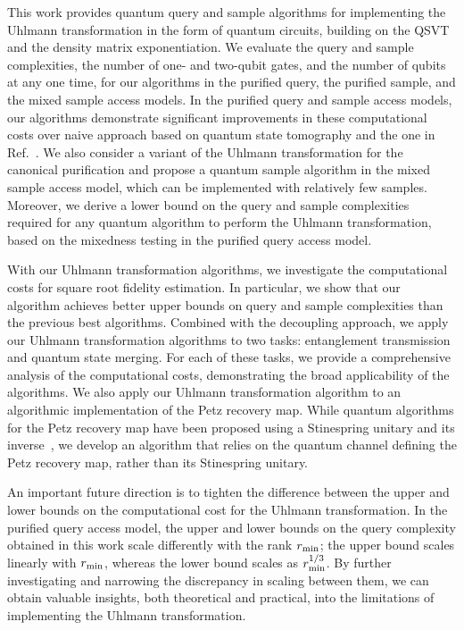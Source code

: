 

This work provides quantum query and sample algorithms for implementing the Uhlmann transformation in the form of quantum circuits, building on the QSVT and the density matrix exponentiation.
We evaluate the query and sample complexities, the number of one- and two-qubit gates, and the number of qubits at any one time, for our algorithms in the purified query, the purified sample, and the mixed sample access models. 
In the purified query and sample access models, our algorithms demonstrate significant improvements in these computational costs over naive approach based on quantum state tomography and the one in Ref.~\cite{metger2023stateqipspace}.
We also consider a variant of the Uhlmann transformation for the canonical purification and propose a quantum sample algorithm in the mixed sample access model, which can be implemented with relatively few samples.
Moreover, we derive a lower bound on the query and sample complexities required for any quantum algorithm to perform the Uhlmann transformation, based on the mixedness testing in the purified query access model.



With our Uhlmann transformation algorithms, we investigate the computational costs for square root fidelity estimation.
In particular, we show that our algorithm achieves better upper bounds on query and sample complexities than the previous best algorithms.
Combined with the decoupling approach, we apply our Uhlmann transformation algorithms to two tasks: entanglement transmission and quantum state merging.
For each of these tasks, we provide a comprehensive analysis of the computational costs, demonstrating the broad applicability of the algorithms.
We also apply our Uhlmann transformation algorithm to an algorithmic implementation of the Petz recovery map.
While quantum algorithms for the Petz recovery map have been proposed using a Stinespring unitary and its inverse~\cite{gilyen2022petzmap, biswas2023noiseadapted}, we develop an algorithm that relies on the quantum channel defining the Petz recovery map, rather than its Stinespring unitary.






An important future direction is to tighten the difference between the upper and lower bounds on the computational cost for the Uhlmann transformation.
In the purified query access model, the upper and lower bounds on the query complexity obtained in this work scale differently with the rank $r_{\rm min}$; the upper bound scales linearly with $r_{\rm min}$, whereas the lower bound scales as $r_{\rm min}^{1/3}$. 
By further investigating and narrowing the discrepancy in scaling between them, we can obtain valuable insights, both theoretical and practical, into the limitations of implementing the Uhlmann transformation.


